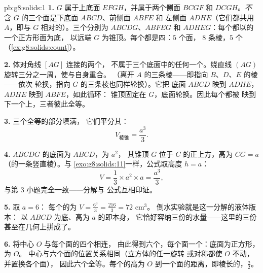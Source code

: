\begin{solution}{pb:g8:solids:1}
\textbf{1.} $G$ 属于上底面 $EFGH$，并属于两个侧面
$BCGF$ 和 $DCGH$。\emph{不}
含 $G$ 的三个面是下底面 $ABCD$、前侧面 $ABFE$ 和
左侧面 $ADHE$（它们都共用 $A$，即与
$G$ 相对的）。三个分别为 $ABCDG$、$ABFEG$ 和
$ADHEG$：每个都以的一个正方形面为底，
以远端 $G$ 为锥顶。每个都是四：$5$ 个面，
$8$ 条棱，$5$ 个（\cref{ex:g8:solids:count}）。

\textbf{2.} 体对角线 $[AG]$ 连接的两个，
不属于三个底面中的任何一个。绕直线
$(AG)$ 旋转三分之一周，使与自身重合。
（离开 $A$ 的三条棱——即指向 $B$、$D$、$E$ 的棱——依次
轮换，指向 $G$ 的三条棱也同样轮换）。它把
底面 $ABCD$ 映到 $ADHE$，$ADHE$ 映到 $ABFE$，如此循环：
锥顶固定在 $G$，底面轮换。因此每个都被
映到下一个上，三者彼此全等。

\textbf{3.} 三个全等的部分填满，
它们平分其：
\[
V_{\text{棱锥}} = \frac{a^3}{3} .
\]

\textbf{4.}  $ABCDG$ 的底面为 $ABCD$，为 $a^2$，
其锥顶 $G$ 位于 $C$ 的正上方，高为
$CG = a$（的一条竖直棱）。与
\cref{exo:g8:solids:11}一样，公式取高度
$h = a$：
\[
V = \frac13 \times a^2 \times a = \frac{a^3}{3} ,
\]
与第 3 小题完全一致——分解与
公式互相印证。

\textbf{5.} 取 $a = 6$：
每个的为 $V = \frac{6^3}{3} = \frac{216}{3} = 72$ cm$^3$。
倒水实验就是这一分解的液体版本：
以 $ABCD$ 为底、高为 $a$ 的即本身，
它恰好容纳三份的水量——这里的三份
甚至在几何上拼成了。

\textbf{6.} 将中心 $O$ 与每个面的四个相连，
由此得到六个，每个面一个：底面为正方形，为 $O$。
中心与六个面的位置关系相同（立方体的任一旋转
或对称都使 $O$ 不动，并置换各个面），
因此六个全等。每个的高为
$O$ 到一个面的距离，即棱长的，$\frac{a}{2}$。


\end{solution}
